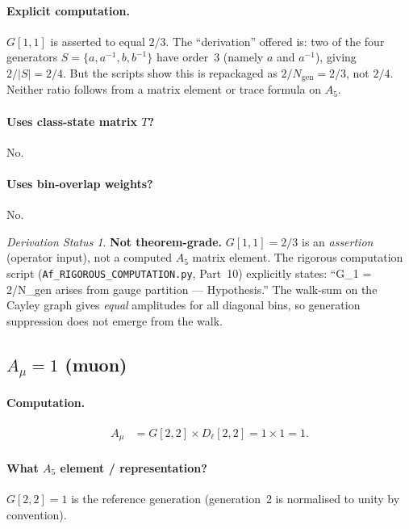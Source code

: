 \documentclass[11pt]{article}
\theoremstyle{remark}
\newtheorem*{status}{Derivation Status}
\begin{document}
\paragraph{Explicit computation.}
$G[1,1]$ is asserted to equal $2/3$.
The ``derivation'' offered is: two of the four generators $S = \{a, a^{-1}, b, b^{-1}\}$ have order~3 (namely $a$ and $a^{-1}$), giving $2/|S| = 2/4$.
But the scripts show this is repackaged as $2/N_{\mathrm{gen}} = 2/3$, not $2/4$.
Neither ratio follows from a matrix element or trace formula on $A_5$.

\paragraph{Uses class-state matrix $T$?} No.
\paragraph{Uses bin-overlap weights?} No.

\begin{status}
\textbf{Not theorem-grade.}
$G[1,1] = 2/3$ is an \emph{assertion} (operator input), not a computed $A_5$ matrix element.
The rigorous computation script (\texttt{Af\_RIGOROUS\_COMPUTATION.py}, Part~10) explicitly states:
``G\_1 = 2/N\_gen arises from gauge partition --- Hypothesis.''
The walk-sum on the Cayley graph gives \emph{equal} amplitudes for all diagonal bins, so generation suppression does not emerge from the walk.
\end{status}

\subsection{$A_\mu = 1$ \quad (muon)}

\paragraph{Computation.}
\begin{align}
A_\mu &= G[2,2] \times D_\ell[2,2] = 1 \times 1 = 1.
\end{align}

\paragraph{What $A_5$ element / representation?}
$G[2,2] = 1$ is the reference generation (generation~2 is normalised to unity by convention).
\end{document}
